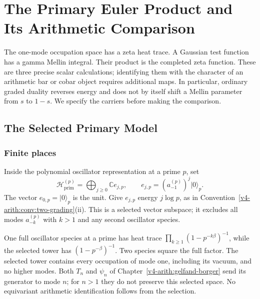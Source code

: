 \chapter{The Primary Euler Product and Its Arithmetic Comparison}
\label{v4-arith:prim-zeta-char}

The one-mode occupation space has a zeta heat trace. A Gaussian test
function has a gamma Mellin integral. Their product is the completed
zeta function. These are three precise scalar calculations; identifying
them with the character of an arithmetic bar or cobar object requires
additional maps. In particular, ordinary graded duality reverses energy
and does not by itself shift a Mellin parameter from \(s\) to \(1-s\).
We specify the carriers before making the comparison.

\section{The Selected Primary Model}
\label{v4-arith:prim-zeta:primary-subspace}
\label{v4-arith:prim-zeta:att-1-primary}
\subsection{Finite places}
\label{v4-arith:prim-zeta:local-primary}

\begin{definition}
\label{v4-arith:prim-zeta:def:p-primary}
Inside the polynomial oscillator representation at a prime \(p\), set
\begin{equation}
\label{v4-arith:prim-zeta:eq:p-primary}
 \mathcal H^{(p)}_{\mathrm{prim}}
 =\bigoplus_{j\ge0}\mathbb C e_{j,p},\qquad
 e_{j,p}=(a^{(p)}_{-1})^j|0\rangle_p.
\end{equation}
The vector \(e_{0,p}=|0\rangle_p\) is the unit. Give \(e_{j,p}\) energy
\(j\log p\), as in Convention~\ref{v4-arith:conv:two-grading}(ii).
This is a selected vector subspace; it excludes all modes \(a_{-k}^{(p)}\)
with \(k>1\) and any second oscillator species.
\end{definition}

\begin{remark}
\label{v4-arith:prim-zeta:rem:exclude-doubles}
\label{v4-arith:prim-zeta:rem:why-primary}
One full oscillator species at a prime has heat trace
\(\prod_{k\ge1}(1-p^{-k\beta})^{-1}\), while the selected tower has
\((1-p^{-\beta})^{-1}\). Two species square the full factor.
The selected tower contains every occupation of mode one, including
its vacuum, and no higher modes. Both \(T_n\) and \(\psi_n\) of
Chapter~\ref{v4-arith:gelfand-borger} send its generator to mode \(n\);
for \(n>1\) they do not preserve this selected space. No equivariant
arithmetic identification follows from the selection.
\end{remark}

